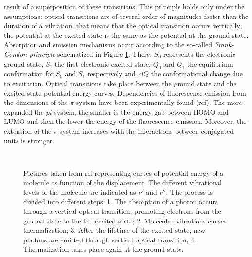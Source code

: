 \documentclass  [
  paper    = a4,
  BCOR     = 10mm,
  twoside,
  fontsize = 12pt,
  fleqn,
  toc      = bibnumbered,
  toc      = listofnumbered,
  numbers  = noendperiod,
  headings = normal,
  listof   = leveldown,
  version  = 3.03
]                                       {scrreprt}
\begin{document}
result of a superposition of these transitions. This principle holds only under the assumptions: optical transitions are of several order of magnitudes faster than the duration of a vibration, that means that the optical transition occurs vertically; the potential at the excited state is the same as the potential at the ground state. Absorption and emission mechanisms occur according to the so-called \emph{Frank-Condon principle} schematized in Figure \ref{fig:frank}. There, $S_0$ represents the electronic ground state, $S_1$ the first electronic excited state, $Q_0$ and $Q_1$ the equilibrium conformation for $S_0$ and $S_1$ respectively and $\Delta Q$ the conformational change due to excitation. Optical transitions take place between the ground state and the excited state potential energy curves. Dependencies of fluorescence emission from the dimensions of the $\pi$-system have been experimentally found (ref). The more expanded the $pi$-system, the smaller is the energy gap between HOMO and LUMO and then the lower the energy of the fluorescence emission. Moreover, the extension of the $\pi$-system increases with the interactions between conjugated units is stronger.\\
\begin{figure}[!t]
	\centering%
	\\
	\caption{\footnotesize Pictures taken from  ref representing curves of potential energy of a molecule as function of the displacement. The different vibrational levels of the molecule are indicated as $\nu'$ and $\nu''$. The process is divided into different steps: 1. The absorption of a photon occurs through a vertical optical transition, promoting electrons from the ground state to the the excited state; 2. Molecular vibrations causes thermalization; 3. After the lifetime of the excited state, new photons are emitted through vertical optical transition; 4. Thermalization takes place again at the ground state.}
	\label{fig:frank}
\end{figure}
\end{document}
